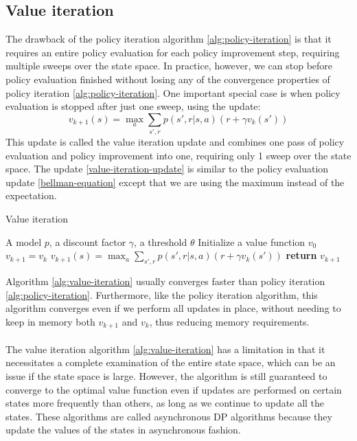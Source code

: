 \subsection{Value iteration}
The drawback of the policy iteration algorithm \ref{alg:policy-iteration} is that it requires an entire policy evaluation for each policy improvement step, requiring multiple sweeps over the state space. In practice, however, we can stop before policy evaluation finished without losing any of the convergence properties of policy iteration \ref{alg:policy-iteration}. One important special case is when policy evaluation is stopped after just one sweep, using the update:
\begin{equation}
    v_{k+1}(s) = \max_a \sum_{s', r} p(s', r | s, a) (r + \gamma v_k(s'))
    \label{value-iteration-update}
\end{equation}
This update is called the value iteration update and combines one pass of policy evaluation and policy improvement into one, requiring only 1 sweep over the state space. The update \eqref{value-iteration-update} is similar to the policy evaluation update \eqref{bellman-equation} except that we are using the maximum instead of the expectation.
\begin{algorithm}[H]
    \caption{Value iteration}
    \label{alg:value-iteration}
    \begin{algorithmic}[1]
        \Require A model $p$, a discount factor $\gamma$, a threshold $\theta$
        \State Initialize a value function $v_{0}$
            \State $v_{k+1} = v_k$
                \State $v_{k+1}(s) = \max_a \sum_{s', r} p(s', r | s, a) (r + \gamma v_k(s'))$
            \EndFor
                \State \textbf{return} $v_{k+1}$
            \EndIf
        \EndWhile
    \end{algorithmic}
\end{algorithm}
Algorithm \ref{alg:value-iteration} usually converges faster than policy iteration \ref{alg:policy-iteration}. Furthermore, like the policy iteration algorithm, this algorithm converges even if we perform all updates in place, without needing to keep in memory both $v_{k+1}$ and $v_k$, thus reducing memory requirements.\\\\
The value iteration algorithm \ref{alg:value-iteration} has a limitation in that it necessitates a complete examination of the entire state space, which can be an issue if the state space is large. However, the algorithm is still guaranteed to converge to the optimal value function even if updates are performed on certain states more frequently than others, as long as we continue to update all the states. These algorithms are called asynchronous DP algorithms because they update the values of the states in asynchronous fashion.


